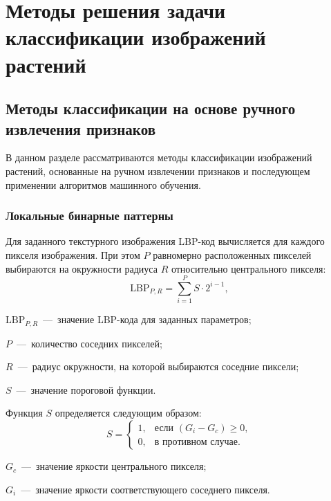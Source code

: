 \clearpage

\section{Методы решения задачи классификации изображений растений}
\subsection{Методы классификации на основе ручного извлечения признаков}
В данном разделе рассматриваются методы классификации изображений растений, основанные на ручном извлечении признаков и последующем применении алгоритмов машинного обучения.
\subsubsection{Локальные бинарные паттерны}
Для заданного текстурного изображения LBP-код вычисляется для каждого пикселя изображения. При этом $P$ равномерно расположенных пикселей выбираются на окружности радиуса $R$ относительно центрального пикселя:
\begin{equation}
	\mathrm{LBP}_{P,R} = \sum_{i=1}^{P} S \cdot 2^{i-1},
\end{equation}
\begin{formulaexplanation}
	\item $\mathrm{LBP}_{P,R}$~---~значение LBP-кода для заданных параметров;
	\item $P$~---~количество соседних пикселей;
	\item $R$~---~радиус окружности, на которой выбираются соседние пиксели;
	\item $S$~---~значение пороговой функции.
\end{formulaexplanation}

Функция $S$ определяется следующим образом:
\begin{equation}
	S =
	\begin{cases}
		1, & \text{если } (G_i - G_c) \geqslant 0, \\
		0, & \text{в противном случае}.
	\end{cases}
\end{equation}
\begin{formulaexplanation}
	\item $G_c$~---~значение яркости центрального пикселя;
	\item $G_i$~---~значение яркости соответствующего соседнего пикселя.
\end{formulaexplanation}

